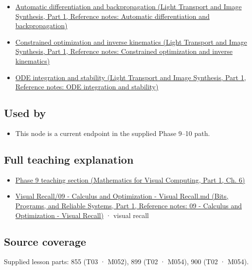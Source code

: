 \begin{itemize}
\tightlist
\item
  \href{../04-Light-Transport-and-Image-Synthesis-P01/main.pdf\#nameddest=appendix-40df0855b4a7}{Automatic differentiation and backpropagation (Light Transport and Image Synthesis, Part 1, Reference notes: Automatic differentiation and backpropagation)}
\item
  \href{../04-Light-Transport-and-Image-Synthesis-P01/main.pdf\#nameddest=appendix-29f4bea4c2bb}{Constrained optimization and inverse kinematics (Light Transport and Image Synthesis, Part 1, Reference notes: Constrained optimization and inverse kinematics)}
\item
  \href{../04-Light-Transport-and-Image-Synthesis-P01/main.pdf\#nameddest=appendix-18eacf61a04b}{ODE integration and stability (Light Transport and Image Synthesis, Part 1, Reference notes: ODE integration and stability)}
\end{itemize}

\subsection{Used by}\label{appendix-8836553d56fc-used-by}

\hypertarget{appendix-8836553d56fc-used-by}{}

\begin{itemize}
\tightlist
\item
  This node is a current endpoint in the supplied Phase 9--10 path.
\end{itemize}

\subsection{Full teaching explanation}\label{appendix-8836553d56fc-full-teaching-explanation}

\hypertarget{appendix-8836553d56fc-full-teaching-explanation}{}

\begin{itemize}
\tightlist
\item
  \href{../02-Mathematics-for-Visual-Computing-P01/main.pdf\#nameddest=02-foundations-ii-ch022-numerical-differentiation-and-automatic-differentiation}{Phase 9 teaching section (Mathematics for Visual Computing, Part 1, Ch. 6)}
\item
  \href{../01-Bits-Programs-and-Reliable-Systems-P01/main.pdf\#nameddest=appendix-adf48f5dc5c1}{Visual Recall/09 - Calculus and Optimization - Visual Recall.md (Bits, Programs, and Reliable Systems, Part 1, Reference notes: 09 - Calculus and Optimization - Visual Recall)} · visual recall
\end{itemize}

\subsection{Source coverage}\label{appendix-8836553d56fc-source-coverage}

\hypertarget{appendix-8836553d56fc-source-coverage}{}

Supplied lesson parts: 855 (T03 · M052), 899 (T02 · M054), 900 (T02 · M054).

